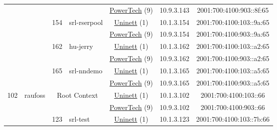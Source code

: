 \begin{small}
\begin{center}
\begin{longtable}{|c|c|c|c|c|c|c|c|}
  &  &  &  & \multicolumn{2}{|c|}{\tiny{\href{http://www.powertech.no}{PowerTech} (9)}} & \tiny{10.9.3.143} & \tiny{2001:700:4100:903::8f:65} \\* \cline{3-3}\cline{4-4}\cline{5-5}\cline{6-6}\cline{7-7}\cline{8-8}
  &  & \multirow{2}{*}{\tiny{154}} & \multicolumn{1}{|l|}{\multirow{2}{*}{\tiny{srl-rserpool}}} & \multicolumn{2}{|c|}{\tiny{\href{https://www.uninett.no}{Uninett} (1)}} & \tiny{10.1.3.154} & \tiny{2001:700:4100:103::9a:65} \\* \cline{5-5}\cline{6-6}\cline{7-7}\cline{8-8}
  &  &  &  & \multicolumn{2}{|c|}{\tiny{\href{http://www.powertech.no}{PowerTech} (9)}} & \tiny{10.9.3.154} & \tiny{2001:700:4100:903::9a:65} \\* \cline{3-3}\cline{4-4}\cline{5-5}\cline{6-6}\cline{7-7}\cline{8-8}
  &  & \multirow{2}{*}{\tiny{162}} & \multicolumn{1}{|l|}{\multirow{2}{*}{\tiny{hu-jerry}}} & \multicolumn{2}{|c|}{\tiny{\href{https://www.uninett.no}{Uninett} (1)}} & \tiny{10.1.3.162} & \tiny{2001:700:4100:103::a2:65} \\* \cline{5-5}\cline{6-6}\cline{7-7}\cline{8-8}
  &  &  &  & \multicolumn{2}{|c|}{\tiny{\href{http://www.powertech.no}{PowerTech} (9)}} & \tiny{10.9.3.162} & \tiny{2001:700:4100:903::a2:65} \\* \cline{3-3}\cline{4-4}\cline{5-5}\cline{6-6}\cline{7-7}\cline{8-8}
  &  & \multirow{2}{*}{\tiny{165}} & \multicolumn{1}{|l|}{\multirow{2}{*}{\tiny{srl-nndemo}}} & \multicolumn{2}{|c|}{\tiny{\href{https://www.uninett.no}{Uninett} (1)}} & \tiny{10.1.3.165} & \tiny{2001:700:4100:103::a5:65} \\* \cline{5-5}\cline{6-6}\cline{7-7}\cline{8-8}
  &  &  &  & \multicolumn{2}{|c|}{\tiny{\href{http://www.powertech.no}{PowerTech} (9)}} & \tiny{10.9.3.165} & \tiny{2001:700:4100:903::a5:65} \\ \hline
 \multirow{20}{*}{\tiny{102}} & \multicolumn{1}{|l|}{\multirow{20}{*}{\tiny{raufoss}}} & \multicolumn{2}{|c|}{\multirow{2}{*}{\tiny{Root Context}}} & \multicolumn{2}{|c|}{\tiny{\href{https://www.uninett.no}{Uninett} (1)}} & \tiny{10.1.3.102} & \tiny{2001:700:4100:103::66} \\* \cline{5-5}\cline{6-6}\cline{7-7}\cline{8-8}
  &  & \multicolumn{2}{|c|}{} & \multicolumn{2}{|c|}{\tiny{\href{http://www.powertech.no}{PowerTech} (9)}} & \tiny{10.9.3.102} & \tiny{2001:700:4100:903::66} \\* \cline{3-3}\cline{4-4}\cline{5-5}\cline{6-6}\cline{7-7}\cline{8-8}
  &  & \multirow{2}{*}{\tiny{123}} & \multicolumn{1}{|l|}{\multirow{2}{*}{\tiny{srl-test}}} & \multicolumn{2}{|c|}{\tiny{\href{https://www.uninett.no}{Uninett} (1)}} & \tiny{10.1.3.123} & \tiny{2001:700:4100:103::7b:66} \\* \cline{5-5}\cline{6-6}\cline{7-7}\cline{8-8}

\end{longtable}
\end{center}
\end{small}
